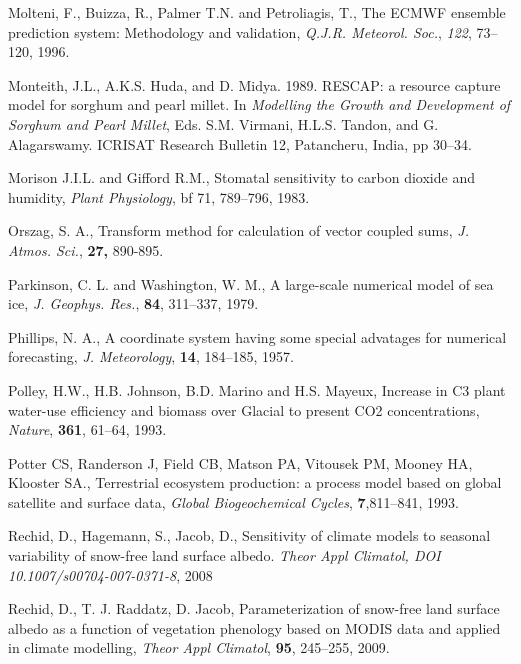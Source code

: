 \begin{thebibliography}{}
 Molteni, F., Buizza, R.,
 Palmer T.N. and Petroliagis, T., The ECMWF ensemble prediction
 system: Methodology and validation, {\em Q.J.R. Meteorol. Soc.},
 {\em 122}, 73--120, 1996.

 Monteith, J.L., A.K.S. Huda, and D. Midya. 1989. RESCAP: a resource
 capture model for sorghum and pearl millet.  In {\it Modelling
 the Growth and Development of Sorghum and Pearl Millet},  Eds.
 S.M. Virmani, H.L.S. Tandon, and G. Alagarswamy.
 ICRISAT Research Bulletin 12, Patancheru, India, pp 30--34.

 Morison J.I.L. and Gifford R.M., Stomatal sensitivity to carbon dioxide
 and humidity, {\it Plant Physiology}, {bf 71}, 789--796, 1983.

 Orszag, S. A.,
 Transform method for calculation of vector coupled sums,
 {\em J. Atmos. Sci.}, {\bf 27,} 890-895.

 Parkinson, C. L. and Washington, W. M.,
 A large-scale numerical model of sea ice,
 {\em J. Geophys. Res.}, {\bf 84}, 311--337, 1979.

 Phillips, N. A.,
 A coordinate system having some special advatages for
 numerical forecasting,
 {\em J. Meteorology}, {\bf 14}, 184--185, 1957.

 Polley, H.W., H.B. Johnson, B.D. Marino and H.S. Mayeux, Increase in C3
 plant water-use efficiency and biomass over Glacial to present CO2
 concentrations, {\it Nature}, {\bf 361}, 61--64, 1993.

 Potter CS, Randerson J, Field CB, Matson PA, Vitousek PM, Mooney HA,
 Klooster SA., Terrestrial ecosystem production: a process model based
 on global satellite and surface data,
 {\it Global Biogeochemical Cycles}, {\bf 7},811--841, 1993.

 Rechid, D., Hagemann, S., Jacob, D.,  
 Sensitivity of climate models to seasonal variability of 
 snow-free land surface albedo.
 {\em Theor Appl Climatol, DOI 10.1007/s00704-007-0371-8}, 2008

 Rechid, D., T. J. Raddatz, D. Jacob, Parameterization of snow-free land
 surface albedo as a function of vegetation phenology based on MODIS
 data and applied in climate modelling,
 {\it Theor Appl Climatol}, {\bf 95}, 245--255, 2009.


\end{thebibliography}
